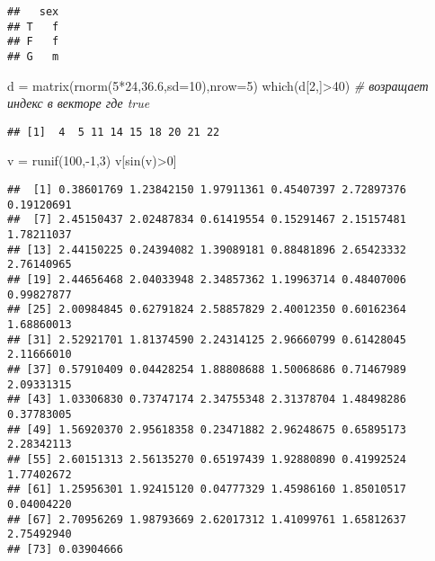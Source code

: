 \documentclass[]{article}
\newenvironment{Shaded}{\begin{snugshade}}{\end{snugshade}}
\newcommand{\AttributeTok}[1]{\textcolor[rgb]{0.77,0.63,0.00}{#1}}
\newcommand{\CommentTok}[1]{\textcolor[rgb]{0.56,0.35,0.01}{\textit{#1}}}
\newcommand{\DecValTok}[1]{\textcolor[rgb]{0.00,0.00,0.81}{#1}}
\newcommand{\FloatTok}[1]{\textcolor[rgb]{0.00,0.00,0.81}{#1}}
\newcommand{\FunctionTok}[1]{\textcolor[rgb]{0.00,0.00,0.00}{#1}}
\newcommand{\NormalTok}[1]{#1}
\newcommand{\OtherTok}[1]{\textcolor[rgb]{0.56,0.35,0.01}{#1}}
\newcommand{\SpecialCharTok}[1]{\textcolor[rgb]{0.00,0.00,0.00}{#1}}
\begin{document}
\begin{verbatim}
##   sex
## T   f
## F   f
## G   m
\end{verbatim}

\begin{Shaded}
\begin{Highlighting}[]
\NormalTok{d }\OtherTok{=} \FunctionTok{matrix}\NormalTok{(}\FunctionTok{rnorm}\NormalTok{(}\DecValTok{5}\SpecialCharTok{*}\DecValTok{24}\NormalTok{,}\FloatTok{36.6}\NormalTok{,}\AttributeTok{sd=}\DecValTok{10}\NormalTok{),}\AttributeTok{nrow=}\DecValTok{5}\NormalTok{)}
\FunctionTok{which}\NormalTok{(d[}\DecValTok{2}\NormalTok{,]}\SpecialCharTok{\textgreater{}}\DecValTok{40}\NormalTok{) }\CommentTok{\# возращает индекс в векторе где true}
\end{Highlighting}
\end{Shaded}

\begin{verbatim}
## [1]  4  5 11 14 15 18 20 21 22
\end{verbatim}

\begin{Shaded}
\begin{Highlighting}[]
\NormalTok{v }\OtherTok{=} \FunctionTok{runif}\NormalTok{(}\DecValTok{100}\NormalTok{,}\SpecialCharTok{{-}}\DecValTok{1}\NormalTok{,}\DecValTok{3}\NormalTok{)}
\NormalTok{v[}\FunctionTok{sin}\NormalTok{(v)}\SpecialCharTok{\textgreater{}}\DecValTok{0}\NormalTok{]}
\end{Highlighting}
\end{Shaded}

\begin{verbatim}
##  [1] 0.38601769 1.23842150 1.97911361 0.45407397 2.72897376 0.19120691
##  [7] 2.45150437 2.02487834 0.61419554 0.15291467 2.15157481 1.78211037
## [13] 2.44150225 0.24394082 1.39089181 0.88481896 2.65423332 2.76140965
## [19] 2.44656468 2.04033948 2.34857362 1.19963714 0.48407006 0.99827877
## [25] 2.00984845 0.62791824 2.58857829 2.40012350 0.60162364 1.68860013
## [31] 2.52921701 1.81374590 2.24314125 2.96660799 0.61428045 2.11666010
## [37] 0.57910409 0.04428254 1.88808688 1.50068686 0.71467989 2.09331315
## [43] 1.03306830 0.73747174 2.34755348 2.31378704 1.48498286 0.37783005
## [49] 1.56920370 2.95618358 0.23471882 2.96248675 0.65895173 2.28342113
## [55] 2.60151313 2.56135270 0.65197439 1.92880890 0.41992524 1.77402672
## [61] 1.25956301 1.92415120 0.04777329 1.45986160 1.85010517 0.04004220
## [67] 2.70956269 1.98793669 2.62017312 1.41099761 1.65812637 2.75492940
## [73] 0.03904666
\end{verbatim}
\end{document}
